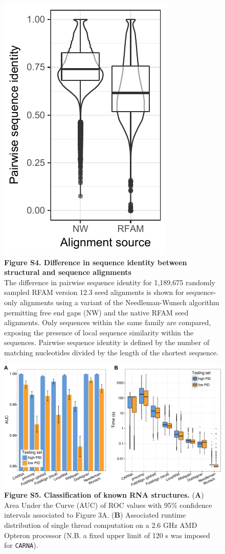 \documentclass{bmcart}
\newcommand\carna{\texttt{CARNA}}
\begin{document}
\begin{figure}
 \includegraphics{SF4}
 \caption*{ \textbf{ Figure S4. Difference in sequence identity between structural and sequence alignments}\\
The difference in pairwise sequence identity for 1,189,675 randomly sampled RFAM version 12.3 seed 
 alignments is shown for sequence-only alignments using a variant of the Needleman-Wunsch algorithm
permitting free end gaps (NW) and the native RFAM seed alignments. 
Only sequences within the same family are compared, exposing the presence of  local sequence similarity within the sequences. Pairwise sequence identity is defined by the number of matching nucleotides divided by the length of the 
shortest sequence. 
}
\end{figure}

\begin{figure}
 \includegraphics[width=\textwidth]{SF5}
  \caption* {{\textbf{Figure S5. Classification of known RNA structures.} }
 (\textbf{A})  Area Under the Curve (AUC) of ROC values with 95\% confidence intervals 
associated to Figure 3A. 
 (\textbf{B}) Associated runtime distribution of single thread computation on a 2.6 GHz AMD Opteron processor 
 (N.B. a fixed upper limit of 120 s was  imposed for \carna{}). } 
\end{figure}
\end{document}
